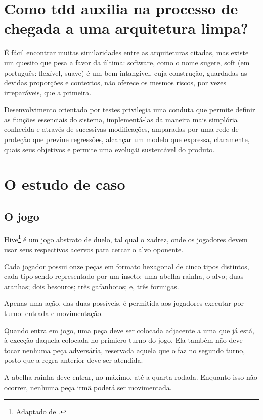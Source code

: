 \section{Como tdd auxilia na processo de chegada a uma arquitetura limpa?}

  É fácil encontrar muitas similaridades entre as arquiteturas citadas, mas existe um quesito que pesa a favor da última: software, como o nome sugere, soft (em português: flexível, suave) é um bem intangível, cuja construção, guardadas as devidas proporções e contextos, não oferece os mesmos riscos, por vezes irreparáveis, que a primeira.

  Desenvolvimento orientado por testes privilegia uma conduta que permite definir as funções essenciais do sistema, implementá-las da maneira mais simplória conhecida e através de sucessivas modificações, amparadas por uma rede de proteção que previne regressões, alcançar um modelo que expressa, claramente, quais seus objetivos e permite uma evoluçãi sustentável do produto.

\section{O estudo de caso}

  \subsection{O jogo}

    Hive\footnote{Adaptado de \cite{UltraBoardGames2020}.} é um jogo abstrato de duelo, tal qual o xadrez, onde os jogadores devem usar seus respectivos acervos para cercar o alvo oponente.

    Cada jogador possui onze peças em formato hexagonal de cinco tipos distintos, cada tipo sendo representado por um inseto: uma abelha rainha, o alvo; duas aranhas; dois besouros; três gafanhotos; e, três formigas.

    Apenas uma ação, das duas possíveis, é permitida aos jogadores executar por turno: entrada e movimentação.

    Quando entra em jogo, uma peça deve ser colocada adjacente a uma que já está, à exceção daquela colocada no primiero turno do jogo. Ela também não deve tocar nenhuma peça adversária, reservada aquela que o faz no segundo turno, posto que a regra anterior deve ser atendida.

    A abelha rainha deve entrar, no máximo, até a quarta rodada. Enquanto isso não ocorrer, nenhuma peça irmã poderá ser movimentada.

